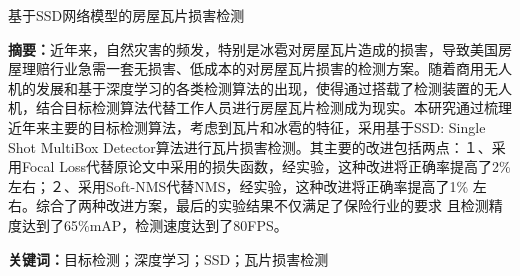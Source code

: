\rule{0pt}{0pt} 
\begin{center}
	\heiti {}  基于SSD网络模型的房屋瓦片损害检测
\end{center}
\rule{0pt}{0pt} 
\par \noindent
\textbf{\songti {}摘要：}近年来，自然灾害的频发，特别是冰雹对房屋瓦片造成的损害，导致美国房屋理赔行业急需一套无损害、低成本的对房屋瓦片损害的检测方案。随着商用无人机的发展和基于深度学习的各类检测算法的出现，使得通过搭载了检测装置的无人机，结合目标检测算法代替工作人员进行房屋瓦片检测成为现实。本研究通过梳理近年来主要的目标检测算法，考虑到瓦片和冰雹的特征，采用基于SSD: Single Shot MultiBox Detector算法进行瓦片损害检测。其主要的改进包括两点：１、采用Focal Loss代替原论文中采用的损失函数，经实验，这种改进将正确率提高了2\% 左右；２、采用Soft-NMS代替NMS，经实验，这种改进将正确率提高了1\% 左右。综合了两种改进方案，最后的实验结果不仅满足了保险行业的要求%
且检测精度达到了65\%mAP，检测速度达到了80FPS。\\

\par \noindent
\textbf{\songti {}关键词：}{\kaishu {}目标检测；深度学习；SSD；瓦片损害检测}

